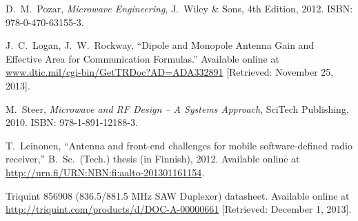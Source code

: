 \documentclass[a4paper, 12pt]{article}
\begin{document}
\begin{thebibliography}{9}%


 D.\ M.\ Pozar, 
	\textit{Microwave Engineering}, 
	J.\ Wiley \& Sons, 4th Edition, 2012. 
	ISBN: 978-0-470-63155-3.
	
 J.\ C.\ Logan, J.\ W.\ Rockway, 
	``Dipole and Monopole Antenna Gain and Effective Area for Communication Formulas.''
	Available online at \url{www.dtic.mil/cgi-bin/GetTRDoc?AD=ADA332891}
	[Retrieved: November 25, 2013].

 M.\ Steer, 
	\textit{Microwave and RF Design -- A Systems Approach}, 
	SciTech Publishing, 2010. 
	ISBN: 978-1-891-12188-3.
	
 T.\ Leinonen, ``Antenna and front-end challenges for mobile software-defined radio receiver,''
	B.\ Sc.\ (Tech.) thesis (in Finnish), 2012. Available online at \url{http://urn.fi/URN:NBN:fi:aalto-201301161154}.
	
 Triquint 856908 (836.5/881.5 MHz SAW Duplexer) datasheet. Available online at 
\url{http://triquint.com/products/d/DOC-A-00000661} [Retrieved: December 1, 2013].
	

\end{thebibliography}
\end{document}
